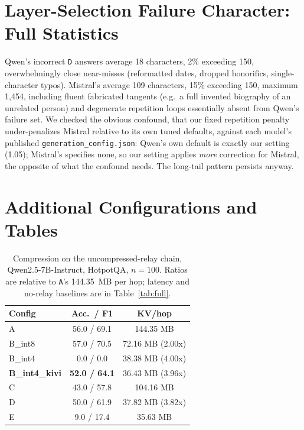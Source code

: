 \documentclass[11pt]{article}
\begin{document}
\section{Layer-Selection Failure Character: Full Statistics}
\label{app:failurechar}

Qwen's incorrect \texttt{D} answers average 18 characters, 2\%
exceeding 150, overwhelmingly close near-misses (reformatted dates,
dropped honorifics, single-character typos). Mistral's average 109
characters, 15\% exceeding 150, maximum 1,454, including fluent
fabricated tangents (e.g.\ a full invented biography of an unrelated
person) and degenerate repetition loops essentially absent from Qwen's
failure set. We checked the obvious confound, that our fixed
repetition penalty under-penalizes Mistral relative to its own tuned
defaults, against each model's published \texttt{generation\_config.json}:
Qwen's own default is exactly our setting (1.05); Mistral's specifies
none, so our setting applies \emph{more} correction for Mistral, the
opposite of what the confound needs. The long-tail pattern persists
anyway.

\section{Additional Configurations and Tables}
\label{app:extratables}

\begin{table}[h]
\centering
\small
\caption{Compression on the uncompressed-relay chain, Qwen2.5-7B-Instruct,
HotpotQA, $n{=}100$. Ratios are relative to \texttt{A}'s 144.35~MB per hop;
latency and no-relay baselines are in Table~\ref{tab:full}.}
\label{tab:main}
\begin{tabular}{lcc}
\toprule
\textbf{Config} & \textbf{Acc.\ / F1} & \textbf{KV/hop} \\
\midrule
A & 56.0 / 69.1 & 144.35 MB \\
B\_int8 & 57.0 / 70.5 & 72.16 MB (2.00x) \\
B\_int4 & 0.0 / 0.0 & 38.38 MB (4.00x) \\
\textbf{B\_int4\_kivi} & \textbf{52.0 / 64.1} & 36.43 MB (3.96x) \\
C & 43.0 / 57.8 & 104.16 MB \\
D & 50.0 / 61.9 & 37.82 MB (3.82x) \\
E & 9.0 / 17.4 & 35.63 MB \\
\bottomrule
\end{tabular}
\end{table}
\end{document}
